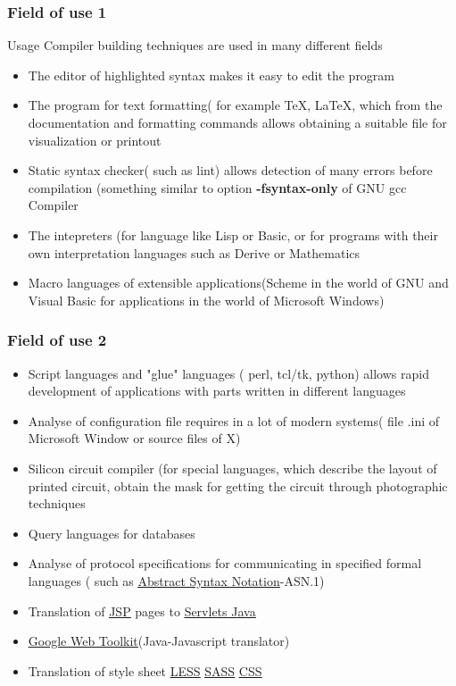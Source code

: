 \documentclass{beamer}
\begin{document}
\begin{frame}
\frametitle{Field of use 1}
\begin{block}{Usage}
Compiler building techniques are used in many different fields
\end{block}
\begin{itemize}
\item The editor of highlighted syntax makes it easy to edit the program
\item The program for text formatting( for example TeX, LaTeX, which from the documentation and formatting commands allows obtaining a suitable file for visualization or printout 
\item Static syntax checker( such as lint) allows detection of many errors before compilation (something similar to option \textbf{-fsyntax-only} of GNU gcc Compiler
\item The intepreters (for language like Lisp or Basic, or for programs with their own interpretation languages such as Derive or Mathematics
\item Macro languages of extensible applications(Scheme in the world of GNU and Visual Basic for applications in the world of Microsoft Windows)
\end{itemize}
\end{frame}
\begin{frame}
\frametitle{Field of use 2}
\begin{itemize}
\item Script languages and "glue" languages ( perl, tcl/tk, python) allows rapid development of applications with parts written in different languages
\item Analyse of configuration file requires in a lot of modern systems( file .ini of Microsoft Window or source files of X)
\item Silicon circuit compiler (for special languages, which describe the layout of printed circuit, obtain the mask for getting the circuit through photographic techniques
\item Query languages for databases
\item Analyse of protocol specifications for communicating in specified formal languages ( such as \href{https://en.wikipedia.org/wiki/Abstract_Syntax_Notation_One}{\underline{Abstract Syntax Notation}}-ASN.1)
\item Translation of \href{https://en.wikipedia.org/wiki/JavaServer_Pages}{\underline{JSP}} pages to \href{https://en.wikipedia.org/wiki/Java_serlets}{\underline{Servlets Java}} 
\item \href{}{\underline{Google Web Toolkit}}(Java-Javascript translator)
\item Translation of style sheet \href{https://es.wikipedia.org/wiki/LESS_(lenguaje_de_hojas_de_estilo)}{\underline{LESS}} \href{https://es.wikipedia.org/wiki/Sass_(lenguaje_de_hojas_de_estilo)}{\underline{SASS}}
\href{https://en.wikipedia.org/wiki/Cascading_Style_Sheets}{\underline{CSS}}
\end{itemize}
\end{frame}
\end{document}
